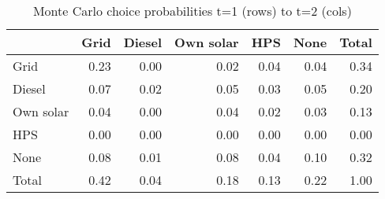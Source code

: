 \begin{table}[!ht]
	\centering
		\caption{Monte Carlo choice probabilities t=1 (rows) to t=2 (cols)}
\begin{tabular}{lrrrrrr}
		\toprule
               &      Grid&    Diesel& Own solar&       HPS&      None&     Total\\
		\midrule
		           Grid&      0.23&      0.00&      0.02&      0.04&      0.04&      0.34\\
		         Diesel&      0.07&      0.02&      0.05&      0.03&      0.05&      0.20\\
		      Own solar&      0.04&      0.00&      0.04&      0.02&      0.03&      0.13\\
		            HPS&      0.00&      0.00&      0.00&      0.00&      0.00&      0.00\\
		           None&      0.08&      0.01&      0.08&      0.04&      0.10&      0.32\\
		          Total&      0.42&      0.04&      0.18&      0.13&      0.22&      1.00\\
		\bottomrule
	\end{tabular}
\end{table}
